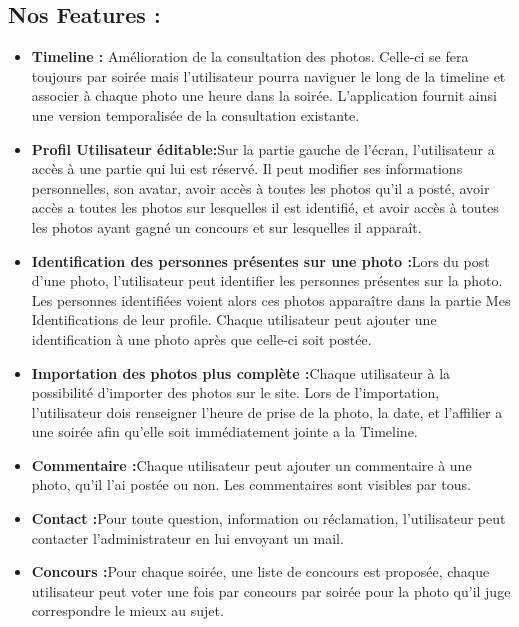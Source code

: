 \documentclass[11pt]{article} %
\begin{document}
\subsection{Nos Features :}
 \begin{itemize}
 
\item \textbf{Timeline :} Amélioration de la consultation des photos. Celle-ci se fera toujours par soirée mais l'utilisateur pourra naviguer le long de la timeline et associer à chaque photo une heure dans la soirée. L'application fournit ainsi une version temporalisée de la consultation existante.


\item \textbf{Profil Utilisateur éditable:}Sur la partie gauche de l’écran, l’utilisateur a accès à une partie qui lui est réservé. Il peut modifier ses informations personnelles, son avatar, avoir accès à toutes les photos qu’il a posté, avoir accès a toutes les photos sur lesquelles il est identifié, et avoir accès à toutes les photos ayant gagné un concours et sur lesquelles il apparaît. 

\item \textbf{Identification des personnes présentes sur une photo :}Lors du post d’une photo, l’utilisateur peut identifier les personnes présentes sur la photo. Les personnes identifiées voient alors ces photos apparaître dans la partie Mes Identifications de leur profile.
Chaque utilisateur peut ajouter une identification à une photo après que celle-ci soit postée.

\item \textbf{Importation des photos plus complète :}Chaque utilisateur à la possibilité d’importer des photos sur le site. Lors de l’importation, l’utilisateur dois renseigner l’heure de prise de la photo, la date, et l’affilier a une soirée afin qu’elle soit immédiatement jointe a la Timeline.


\item \textbf{Commentaire :}Chaque utilisateur peut ajouter un commentaire à une photo, qu’il l’ai postée ou non. Les commentaires sont visibles par tous.


\item \textbf{Contact  :}Pour toute question, information ou réclamation, l’utilisateur peut contacter l’administrateur en lui envoyant un mail. 

\item \textbf{Concours :}Pour chaque soirée, une liste de concours est proposée, chaque utilisateur peut voter une fois par concours par soirée pour la photo qu’il juge correspondre le mieux au sujet. 
\end{itemize}
\end{document}
